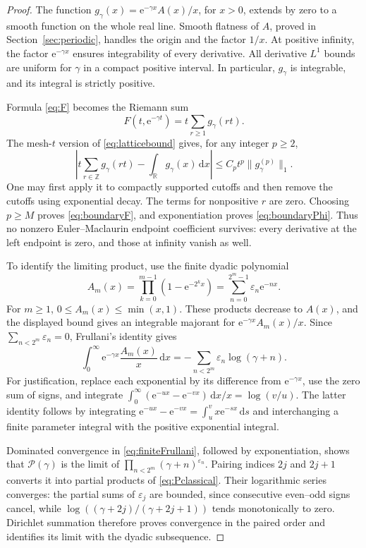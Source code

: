 \documentclass[11pt,oneside]{article}
\numberwithin{equation}{section}
\theoremstyle{definition}
\theoremstyle{remark}
\newcommand{\eps}{\varepsilon}
\newcommand{\ZZ}{\mathbb Z}
\newcommand{\RR}{\mathbb R}
\newcommand{\dd}{\,\mathrm d}
\newcommand{\e}{\mathrm e}
\begin{document}
\begin{proof}
The function
\(g_\gamma(x)=\e^{-\gamma x}A(x)/x\), for \(x>0\), extends by zero to a
smooth function on the whole real line. Smooth flatness of \(A\), proved in
Section~\ref{sec:periodic}, handles the origin and the factor \(1/x\).
At positive infinity, the factor \(\e^{-\gamma x}\) ensures integrability
of every derivative. All derivative \(L^1\) bounds are uniform for \(\gamma\)
in a compact positive interval. In particular, \(g_\gamma\) is integrable,
and its integral is strictly positive.

Formula \eqref{eq:F} becomes the Riemann sum
\begin{equation}
 F(t,\e^{-\gamma t})=t\sum_{r\ge1}g_\gamma(rt).
 \label{eq:riemannboundary}
\end{equation}
The mesh-\(t\) version of \eqref{eq:latticebound} gives, for any integer
\(p\ge2\),
\[
 \left|t\sum_{r\in\ZZ}g_\gamma(rt)-\int_\RR g_\gamma(x)\dd x\right|
 \le C_p t^p\|g_\gamma^{(p)}\|_1.
\]
One may first apply it to compactly supported cutoffs and then remove the
cutoffs using exponential decay. The terms for nonpositive \(r\) are zero.
Choosing \(p\ge M\) proves \eqref{eq:boundaryF}, and exponentiation proves
\eqref{eq:boundaryPhi}. Thus no nonzero Euler--Maclaurin endpoint coefficient
survives: every derivative at the left endpoint is zero, and those at infinity
vanish as well.

To identify the limiting product, use the finite dyadic polynomial
\[
 A_m(x)=\prod_{k=0}^{m-1}(1-\e^{-2^kx})
       =\sum_{n=0}^{2^m-1}\eps_n\e^{-nx}.
\]
For \(m\ge1\), \(0\le A_m(x)\le\min(x,1)\). These products decrease to
\(A(x)\), and the displayed bound gives an integrable majorant for
\(\e^{-\gamma x}A_m(x)/x\). Since \(\sum_{n<2^m}\eps_n=0\), Frullani's
identity gives
\begin{equation}
 \int_0^\infty\e^{-\gamma x}\frac{A_m(x)}x\dd x
       =-\sum_{n<2^m}\eps_n\log(\gamma+n).
 \label{eq:finiteFrullani}
\end{equation}
For justification, replace each exponential by its difference from
\(\e^{-\gamma x}\), use the zero sum of signs, and integrate
\(\int_0^\infty(\e^{-ux}-\e^{-vx})\dd x/x=\log(v/u)\).
The latter identity follows by integrating
\(\e^{-ux}-\e^{-vx}=\int_u^v x\e^{-sx}\dd s\) and interchanging a finite
parameter integral with the positive exponential integral.

Dominated convergence in \eqref{eq:finiteFrullani}, followed by exponentiation,
shows that \(\mathcal P(\gamma)\) is the limit of
\(\prod_{n<2^m}(\gamma+n)^{\eps_n}\). Pairing indices \(2j\) and \(2j+1\)
converts it into partial products of \eqref{eq:Pclassical}. Their logarithmic
series converges: the partial sums of \(\eps_j\) are bounded, since consecutive even--odd
signs cancel, while
\(\log((\gamma+2j)/(\gamma+2j+1))\) tends monotonically to zero.
Dirichlet summation therefore proves convergence in the paired order and
identifies its limit with the dyadic subsequence.
\end{proof}
\end{document}
